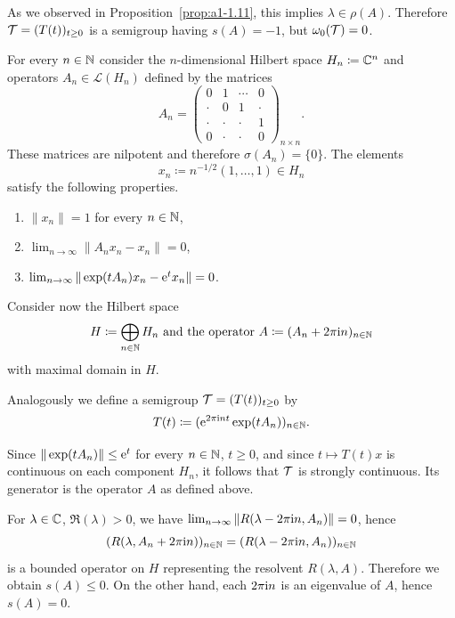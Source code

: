 As we observed in Proposition~\ref{prop:a1-1.11}, this implies $\lambda \in \rho(A)$.
Therefore $\TT = (T(t))_{t\geq 0}$ is a semigroup having $s(A) = -1$, but $\omega_{0}(\mathcal{T}) = 0$.
\begin{example}\label{ex:a3-1.4}
For every $n \in \mathbb{N}$ consider the $n$-dimensional Hilbert space $H_{n} \coloneq \mathbb{C}^{n}$ and operators $A_{n} \in \mathcal{L}(H_{n})$ defined by the matrices
\[
    A_{n} =
    \begin{pmatrix}
    0 & 1 & \cdots & 0 \\
    \cdot & 0 & 1 & \cdot \\
    \cdot & \cdot & \cdot & 1 \\
    0 & \cdot & \cdot & 0
    \end{pmatrix}_{n \times n} .
\]
These matrices are nilpotent and therefore $\sigma(A_{n}) = \{0\}$.
The elements 
\[
	x_{n} \coloneq n^{-1/2}(1, \ldots, 1) \in H_{n}
\]
satisfy the following properties.
\begin{enumerate}[\upshape (i)]
\item
	$\|x_{n}\| = 1$ for every $n \in \mathbb{N}$, 

\item
	$\lim_{n \to \infty} \|A_{n}x_{n} - x_{n}\| = 0$, 

\item
	$\lim_{n \to \infty} \|\exp(tA_{n})x_{n} - \mathrm{e}^{t}x_{n}\| = 0$. 

\end{enumerate}
Consider now the Hilbert space 
%
\[
	\text{$H \coloneq \bigoplus_{n \in \mathbb{N}} H_{n}$ and the operator 
		$A \coloneq (A_{n} + 2\pi\mathrm{i} n)_{n \in \mathbb{N}}$}
\]
%
with maximal domain in $H$.

Analogously we define a semigroup $\TT = (T(t))_{t \geq 0}$ by
\[
    T(t) \coloneq (\mathrm{e}^{2\pi\mathrm{i} nt}\exp(tA_{n}))_{n \in \mathbb{N}} .
\]
\end{example}
Since $\|\exp(tA_{n})\| \leq \eu^{t}$ for every $n \in \mathbb{N}$, $t \geq 0$, and since $t \mapsto T(t)x$ is continuous on each component $H_{n}$, it follows that $\mathcal{T}$ is strongly continuous.
Its generator is the operator $A$ as defined above.

For $\lambda \in \mathbb{C}$, $\Re(\lambda) > 0$, we have 
$\lim_{n \to \infty} \|R(\lambda-2\pi\mathrm{i} n,A_{n})\| = 0$, hence
\[
    (R(\lambda,A_{n}+2\pi\mathrm{i} n))_{n \in \mathbb{N}} = (R(\lambda-2\pi\mathrm{i} n,A_{n}))_{n \in \mathbb{N}}
\]
is a bounded operator on $H$ representing the resolvent $R(\lambda,A)$.
Therefore we obtain $s(A) \leq 0$.
On the other hand, each $2\pi\mathrm{i} n$ is an eigenvalue of\/ $A$, hence $s(A) = 0$.

